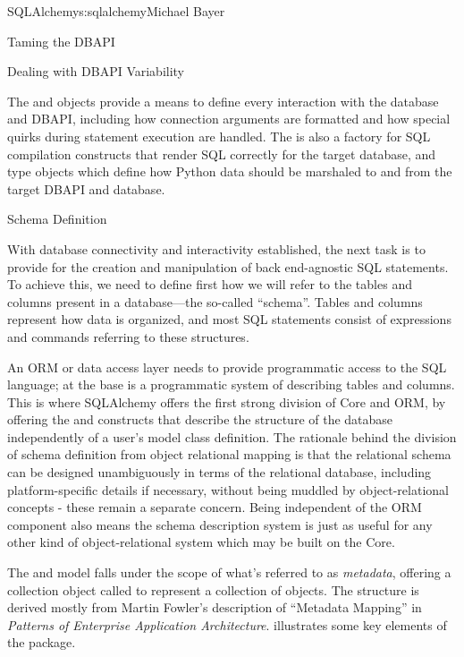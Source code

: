 \begin{aosachapter}{SQLAlchemy}{s:sqlalchemy}{Michael Bayer}
\begin{aosasect1}{Taming the DBAPI}
\begin{aosasect2}{Dealing with DBAPI Variability}

The  and  objects provide a means
to define every interaction with the database and DBAPI,
including how connection arguments are formatted and how special
quirks during statement execution are handled. The 
is also a factory for SQL compilation constructs that render
SQL correctly for the target database, and type objects which
define how Python data should be marshaled to and from the target
DBAPI and database.

\end{aosasect2}

\end{aosasect1}

\begin{aosasect1}{Schema Definition}

With database connectivity and interactivity established, the next task
is to provide for the creation and manipulation of back end-agnostic
SQL statements.  To achieve this, we need to define first how we will
refer to the tables and columns present in a database---the so-called
``schema''.  Tables and columns represent how data
is organized, and most SQL statements consist of expressions and
commands referring to these structures.

An ORM or data access layer needs to provide programmatic access to the SQL
language; at the base is a programmatic system of describing tables and
columns. This is where SQLAlchemy offers the first strong division of Core
and ORM, by offering the  and  constructs that describe
the structure of the database independently of a user's model class
definition.  The rationale behind the division of schema definition from object
relational mapping is that the relational schema can be designed
unambiguously in terms of the relational database, including platform-specific
details if necessary, without being muddled by object-relational concepts -
these remain a separate concern. Being independent of the ORM component also
means the schema description system is just as useful for any other kind of
object-relational system which may be built on the Core.

The  and  model falls under the scope of what's
referred to as \emph{metadata}, offering a collection object called  to represent
a collection of  objects.  The structure is derived
mostly from Martin Fowler's description of ``Metadata Mapping'' in
\emph{Patterns of Enterprise Application Architecture}. %
 illustrates
some key elements of the  package.


\end{aosasect1}
\end{aosachapter}

